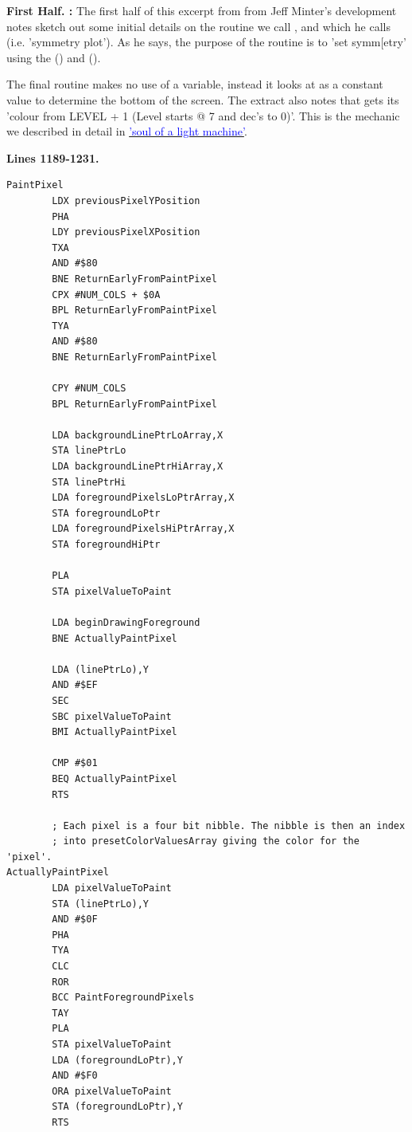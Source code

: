 \textbf{First Half. :} 
The first half of this excerpt from from Jeff Minter's development notes sketch out some initial details on the routine
we call , and which he calls  (i.e. 'symmetry plot'). As he says, the
purpose of the routine is to 'set symm[etry' using the  () and  ().

The final routine makes no use of a  variable, instead it looks at  as a constant value to determine the
bottom of the screen. The extract also notes that  gets its 'colour from LEVEL + 1 (Level starts @ 7 and dec's to 0)'.
This is the mechanic we described in detail in \hyperref[sec:listing_pattern]{\textcolor{blue}{'soul of a light machine'}}.

\clearpage
\textbf{Lines 1189-1231. } 
\begin{lstlisting}[basicstyle=\ttfamily\tiny, caption=The routine responsible for painting patterns.]
PaintPixel
        LDX previousPixelYPosition
        PHA 
        LDY previousPixelXPosition
        TXA 
        AND #$80
        BNE ReturnEarlyFromPaintPixel
        CPX #NUM_COLS + $0A
        BPL ReturnEarlyFromPaintPixel
        TYA 
        AND #$80
        BNE ReturnEarlyFromPaintPixel

        CPY #NUM_COLS
        BPL ReturnEarlyFromPaintPixel

        LDA backgroundLinePtrLoArray,X
        STA linePtrLo
        LDA backgroundLinePtrHiArray,X
        STA linePtrHi
        LDA foregroundPixelsLoPtrArray,X
        STA foregroundLoPtr
        LDA foregroundPixelsHiPtrArray,X
        STA foregroundHiPtr

        PLA 
        STA pixelValueToPaint

        LDA beginDrawingForeground
        BNE ActuallyPaintPixel

        LDA (linePtrLo),Y
        AND #$EF
        SEC 
        SBC pixelValueToPaint
        BMI ActuallyPaintPixel

        CMP #$01
        BEQ ActuallyPaintPixel
        RTS 

        ; Each pixel is a four bit nibble. The nibble is then an index
        ; into presetColorValuesArray giving the color for the 'pixel'.
ActuallyPaintPixel   
        LDA pixelValueToPaint
        STA (linePtrLo),Y
        AND #$0F
        PHA 
        TYA 
        CLC 
        ROR 
        BCC PaintForegroundPixels
        TAY 
        PLA 
        STA pixelValueToPaint
        LDA (foregroundLoPtr),Y
        AND #$F0
        ORA pixelValueToPaint
        STA (foregroundLoPtr),Y
        RTS 
\end{lstlisting}
\clearpage


